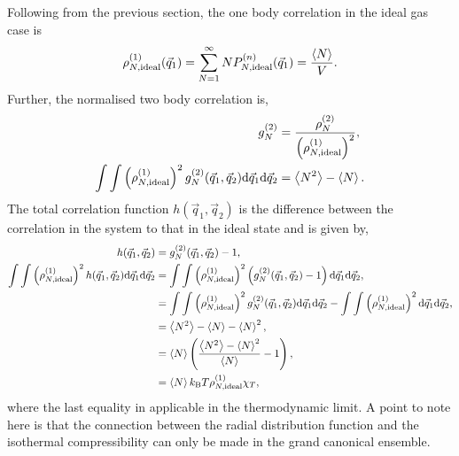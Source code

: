 \documentclass[a4paper]{article}
\begin{document}
Following from the previous section, the one body correlation in the ideal gas case is
\begin{equation}
\rho^{(1)}_{N,{\rm ideal}}(\vec{q}_{1})=\sum_{N=1}^{\infty}N P^{(n)}_{N,{\rm ideal}}(\vec{q}_{1})=\frac{\left<N\right>}{V}.
\end{equation}
Further, the normalised two body correlation is,
\begin{equation}
\begin{split}
g^{(2)}_{N}&=\frac{\rho^{(2)}_{N}}{\left(\rho^{(1)}_{N,{\rm ideal}}\right)^{2}},\\
\int\int \left(\rho^{(1)}_{N,{\rm ideal}}\right)^{2}g^{(2)}_{N}(\vec{q}_{1},\vec{q}_{2}){\rm d}\vec{q}_{1}{\rm d}\vec{q}_{2}&=\left<N^{2}\right>-\left<N\right>.
\end{split}
\end{equation}
The total correlation function $h(\vec{q}_{1},\vec{q}_{2})$ is the difference between the correlation in the system to that in the ideal state and is given by,
\begin{equation}
\begin{split}
h(\vec{q}_{1},\vec{q}_{2})&=g^{(2)}_{N}(\vec{q}_{1},\vec{q}_{2})-1,\\
\int\int \left(\rho^{(1)}_{N,{\rm ideal}}\right)^{2}h(\vec{q}_{1},\vec{q}_{2}){\rm d}\vec{q}_{1}{\rm d}\vec{q}_{2}&=\int\int \left(\rho^{(1)}_{N,{\rm ideal}}\right)^{2}\left(g^{(2)}_{N}(\vec{q}_{1},\vec{q}_{2})-1\right){\rm d}\vec{q}_{1}{\rm d}\vec{q}_{2},\\&=\int\int \left(\rho^{(1)}_{N,{\rm ideal}}\right)^{2}g^{(2)}_{N}(\vec{q}_{1},\vec{q}_{2}){\rm d}\vec{q}_{1}{\rm d}\vec{q}_{2}-\int\int \left(\rho^{(1)}_{N,{\rm ideal}}\right)^{2}{\rm d}\vec{q}_{1}{\rm d}\vec{q}_{2},\\
&=\left<N^{2}\right>-\left<N\right>-\left<N\right>^{2},\\
&=\left<N\right>\left(\frac{\left<N^{2}\right>-\left<N\right>^{2}}{\left<N\right>}-1\right),\\
&=\left<N\right>k_{\rm B}T\rho^{(1)}_{N,{\rm ideal}}\chi_{T},
\end{split}
\end{equation}
where the last equality in applicable in the thermodynamic limit. A point to note here is that the connection between the radial distribution function and the isothermal compressibility can only be made in the grand canonical ensemble.
\end{document}
